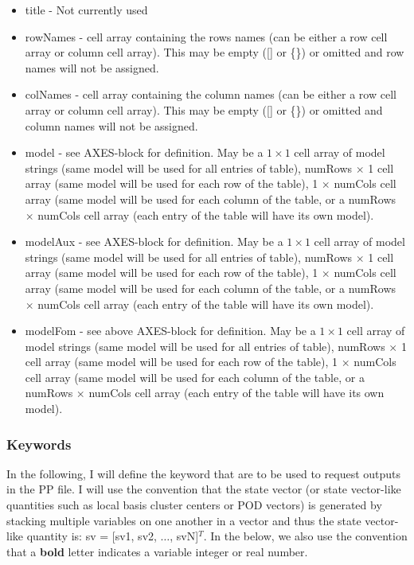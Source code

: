 \documentclass[notitlepage]{report}
\begin{document}
\begin{itemize}
       \item title - Not currently used
       \item rowNames  - cell array containing the rows names (can be either a row cell array or column cell array).  This may be empty ([] or \{\})  or omitted and row names will not be assigned.
       \item colNames -  cell array containing the column names (can be either a row cell array or column cell array). This may be empty ([] or \{\}) or omitted and column names will not be assigned.
       \item model - see AXES-block for definition.  May be a $1 \times 1$ cell array of model strings (same model will be used for all entries of table), numRows $\times$ 1 cell array (same model will be used for each row of the table), 1 $\times$ numCols cell array (same model will be used for each column of the table, or a numRows $\times$ numCols cell array (each entry of the table will have its own model). 
       \item modelAux - see AXES-block for definition.  May be a $1 \times 1$ cell array of model strings (same model will be used for all entries of table), numRows $\times$ 1 cell array (same model will be used for each row of the table), 1 $\times$ numCols cell array (same model will be used for each column of the table, or a numRows $\times$ numCols cell array (each entry of the table will have its own model). 
       \item modelFom - see above AXES-block for definition.  May be a $1 \times 1$ cell array of model strings (same model will be used for all entries of table), numRows $\times$ 1 cell array (same model will be used for each row of the table), 1 $\times$ numCols cell array (same model will be used for each column of the table, or a numRows $\times$ numCols cell array (each entry of the table will have its own model). 
\end{itemize}

\subsubsection{Keywords}
In the following, I will define the keyword that are to be used to request outputs in the PP file.  I will use the convention that the state vector (or state vector-like quantities such as local basis cluster centers or POD vectors) is generated by stacking multiple variables on one another in a vector and thus the state vector-like quantity is: sv = [sv1, sv2, $\dots$, svN]$^T$.  In the below, we also use the convention that a \textbf{bold} letter indicates a variable integer or real number.
\end{document}
